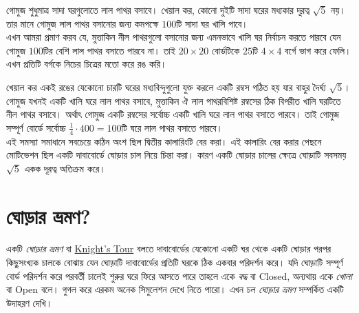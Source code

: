 \documentclass[11pt]{report}
\begin{document}
গোমুজ শুধুমাত্র সাদা ঘরগুলোতে লাল পাথর বসাবে। খেয়াল কর, কোনো দুইটি সাদা ঘরের মধ্যকার দূরত্ব $\sqrt{5}$ নয়। তার মানে গোমুজ লাল পাথর বসানোর জন্য কমপক্ষে $100$টি সাদা ঘর খালি পাবে।\\

এখন আমরা প্রমাণ করব যে, মুত্তাকিন নীল পাথরগুলো বসানোর জন্য এমনভাবে খালি ঘর নির্বাচন করতে পারবে যেন গোমুজ $100$টির বেশি লাল পাথর বসাতে পারবে না। তাই $20 \times 20$ বোর্ডটিকে $25$টি $4 \times 4$ বর্গে ভাগ করে ফেলি। এখন প্রতিটি বর্গকে নিচের চিত্রের মতো করে রঙ করি।\\

\begin{center}
\end{center}

খেয়াল কর একই রঙের যেকোনো চারটি ঘরের মধ্যবিন্দুগুলো যুক্ত করলে একটি রম্বস গঠিত হয় যার বাহুর দৈর্ঘ্য $\sqrt{5}$। গোমুজ যখনই একটি খালি ঘরে লাল পাথর বসাবে, মুত্তাকিন ঐ লাল পাথরবিশিষ্ট রম্বসের ঠিক বিপরীত খালি ঘরটিতে নীল পাথর বসাবে। অর্থাৎ গোমুজ একটি রম্বসের সর্বোচ্চ একটি খালি ঘরে লাল পাথর বসাতে পারবে। তাই গোমুজ সম্পূর্ণ বোর্ডে সর্বোচ্চ $\frac{1}{4} \cdot 400 = 100$টি ঘরে লাল পাথর বসাতে পারবে।\\

এই সমস্যা সমাধানে সবচেয়ে কঠিন অংশ ছিল দ্বিতীয় কালারিংটি বের করা। এই কালারিং বের করার পেছনে মোটিভেশন ছিল একটি দাবাবোর্ডে ঘোড়ার চাল নিয়ে চিন্তা করা। কারণ একটি ঘোড়ার চালের ক্ষেত্রে ঘোড়াটি সবসময় $\sqrt{5}$ একক দূরত্ব অতিক্রম করে।\\

\section{ঘোড়ার ভ্রমণ?}

একটি \textit{ঘোড়ার ভ্রমণ} বা \href{https://en.wikipedia.org/wiki/Knight%27s_tour}{Knight's Tour} বলতে দাবাবোর্ডের যেকোনো একটি ঘর থেকে একটি ঘোড়ার পরপর কিছুসংখ্যক চালকে বোঝায় যেন ঘোড়াটি দাবাবোর্ডের প্রতিটি ঘরকে ঠিক একবার পরিদর্শন করে। যদি ঘোড়াটি সম্পূর্ণ বোর্ড পরিদর্শন করে পরবর্তী চালেই শুরুর ঘরে ফিরে আসতে পারে তাহলে একে \textit{বদ্ধ} বা Closed, অন্যথায় একে \textit{খোলা} বা Open বলে। গুগল করে এরকম অনেক সিমুলেশন দেখে নিতে পারো। এখন চল \textit{ঘোড়ার ভ্রমণ} সম্পর্কিত একটি উদাহরণ দেখি।\\
\end{document}
